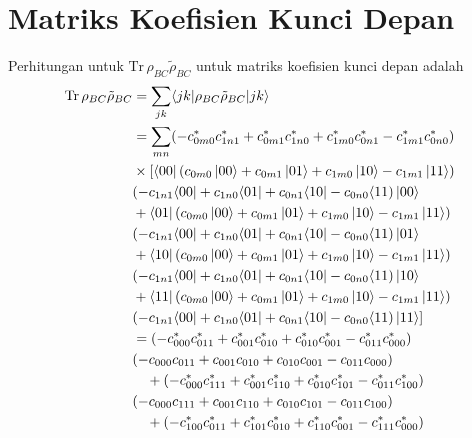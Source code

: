 \chapter{Matriks Koefisien Kunci Depan}
Perhitungan untuk $\mathrm{Tr}\,\rho_{BC} \tilde{\rho}_{BC}$ untuk matriks koefisien kunci depan adalah
\begin{equation}
	\begin{aligned}
		\mathrm{Tr}\,\rho_{BC} \tilde{\rho}_{BC}
		&= \sum_{j k}
		\langle j k |
		\rho_{BC} \tilde{\rho}_{BC}
		| j k \rangle \\
		&= \sum_{m n}
		(- c^{*}_{0m0} c^{*}_{1n1}
		+ c^{*}_{0m1} c^{*}_{1n0}
		+ c^{*}_{1m0} c^{*}_{0n1}
		- c^{*}_{1m1} c^{*}_{0n0})\\
		&\times[\bra{00}(c_{0m0} \ket{00}
		+ c_{0m1} \ket{01}
		+ c_{1m0} \ket{10}
		- c_{1m1} \ket{11})\\
		&(- c_{1n1} \langle 00|
		+ c_{1n0} \langle 01|
		+ c_{0n1} \langle 10|
		- c_{0n0} \langle 11)\ket{00}\\
		&+\bra{01}(c_{0m0} \ket{00}
		+ c_{0m1} \ket{01}
		+ c_{1m0} \ket{10}
		- c_{1m1} \ket{11})\\
		&(- c_{1n1} \langle 00|
		+ c_{1n0} \langle 01|
		+ c_{0n1} \langle 10|
		- c_{0n0} \langle 11)\ket{01}\\
		&+\bra{10}(c_{0m0} \ket{00}
		+ c_{0m1} \ket{01}
		+ c_{1m0} \ket{10}
		- c_{1m1} \ket{11})\\
		&(- c_{1n1} \langle 00|
		+ c_{1n0} \langle 01|
		+ c_{0n1} \langle 10|
		- c_{0n0} \langle 11)\ket{10}\\
		&+\bra{11}(c_{0m0} \ket{00}
		+ c_{0m1} \ket{01}
		+ c_{1m0} \ket{10}
		- c_{1m1} \ket{11})\\
		&(- c_{1n1} \langle 00|
		+ c_{1n0} \langle 01|
		+ c_{0n1} \langle 10|
		- c_{0n0} \langle 11)\ket{11}]\\
		&= (-c^{*}_{000} c^{*}_{011}
		+ c^{*}_{001} c^{*}_{010}
		+ c^{*}_{010} c^{*}_{001}
		- c^{*}_{011} c^{*}_{000})\\
		&(-c_{000} c_{011}
		+ c_{001} c_{010}
		+ c_{010} c_{001}
		- c_{011} c_{000}) \\
		&\quad + (-c^{*}_{000} c^{*}_{111}
		+ c^{*}_{001} c^{*}_{110}
		+ c^{*}_{010} c^{*}_{101}
		- c^{*}_{011} c^{*}_{100})\\
		&(-c_{000} c_{111}
		+ c_{001} c_{110}
		+ c_{010} c_{101}
		- c_{011} c_{100}) \\
		&\quad + (-c^{*}_{100} c^{*}_{011}
		+ c^{*}_{101} c^{*}_{010}
		+ c^{*}_{110} c^{*}_{001}
		- c^{*}_{111} c^{*}_{000})\\

\end{aligned}
\end{equation}
